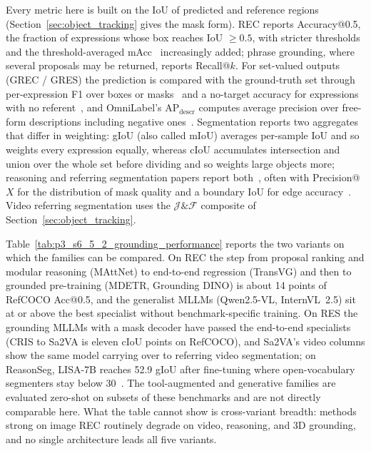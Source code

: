 Every metric here is built on the IoU of predicted and reference regions (Section~\ref{sec:object_tracking} gives the mask form). REC reports Accuracy@0.5, the fraction of expressions whose box reaches IoU $\ge 0.5$, with stricter thresholds and the threshold-averaged mAcc~\cite{chen2025revisiting} increasingly added; phrase grounding, where several proposals may be returned, reports Recall@$k$. For set-valued outputs (GREC / GRES) the prediction is compared with the ground-truth set through per-expression F1 over boxes or masks~\cite{hu2023beyond} and a no-target accuracy for expressions with no referent~\cite{liu2023gres}, and OmniLabel's AP$_{\text{descr}}$ computes average precision over free-form descriptions including negative ones~\cite{schulter2023omnilabel}. Segmentation reports two aggregates that differ in weighting: gIoU (also called mIoU) averages per-sample IoU and so weights every expression equally, whereas cIoU accumulates intersection and union over the whole set before dividing and so weights large objects more; reasoning and referring segmentation papers report both~\cite{lai2024lisa}, often with Precision@$X$ for the distribution of mask quality and a boundary IoU for edge accuracy~\cite{reid2026moondream}. Video referring segmentation uses the $\mathcal{J}\&\mathcal{F}$ composite of Section~\ref{sec:object_tracking}.

Table~\ref{tab:p3_s6_5_2_grounding_performance} reports the two variants on which the families can be compared. On REC the step from proposal ranking and modular reasoning (MAttNet) to end-to-end regression (TransVG) and then to grounded pre-training (MDETR, Grounding DINO) is about 14 points of RefCOCO Acc@0.5, and the generalist MLLMs (Qwen2.5-VL, InternVL~2.5) sit at or above the best specialist without benchmark-specific training. On RES the grounding MLLMs with a mask decoder have passed the end-to-end specialists (CRIS to Sa2VA is eleven cIoU points on RefCOCO), and Sa2VA's video columns show the same model carrying over to referring video segmentation; on ReasonSeg, LISA-7B reaches 52.9 gIoU after fine-tuning where open-vocabulary segmenters stay below 30~\cite{lai2024lisa}. The tool-augmented and generative families are evaluated zero-shot on subsets of these benchmarks and are not directly comparable here. What the table cannot show is cross-variant breadth: methods strong on image REC routinely degrade on video, reasoning, and 3D grounding, and no single architecture leads all five variants.

